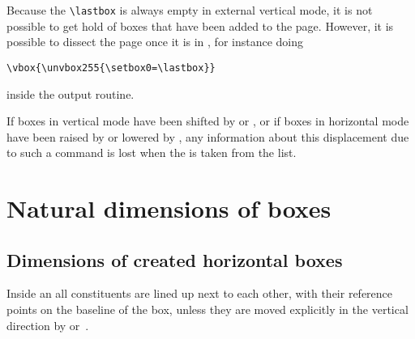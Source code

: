 \documentclass{book}
\begin{document}
Because the \verb-\lastbox- is always empty in external vertical mode,
it is not possible to get hold of boxes that have been
added to the page. However, it is possible to dissect
the page once it is in , for instance doing
\begin{verbatim}
\vbox{\unvbox255{\setbox0=\lastbox}}
\end{verbatim}
inside the output routine.

If boxes in vertical mode have been shifted by 
or , or if boxes in horizontal mode  have
been raised by  or lowered by ,
any information about this
displacement due to such a command is lost when
the  is taken from the list.

\section{Natural dimensions of boxes}

\subsection{Dimensions of created horizontal boxes}

Inside an  all constituents are lined up next to each other,
with their reference points on the baseline of the box,
unless they are moved explicitly in the vertical direction
by  or~.
\end{document}
